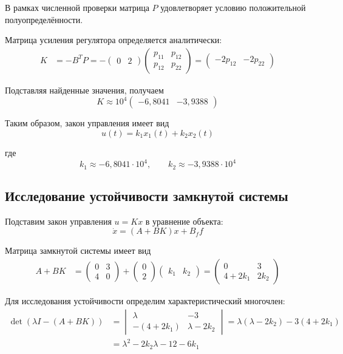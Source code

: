В рамках численной проверки матрица $P$ удовлетворяет
условию положительной полуопределённости.

Матрица усиления регулятора определяется аналитически:
\[
\begin{aligned}
K&=-B^TP=-\begin{pmatrix}0&2\end{pmatrix}
\begin{pmatrix}
p_{11}&p_{12}\\
p_{12}&p_{22}
\end{pmatrix}=\begin{pmatrix}-2p_{12}&-2p_{22}\end{pmatrix}
\end{aligned}
\]

Подставляя найденные значения, получаем
\[
K\approx10^4
\begin{pmatrix}
-6{,}8041&-3{,}9388
\end{pmatrix}
\]

Таким образом, закон управления имеет вид
\[
u(t)=k_1x_1(t)+k_2x_2(t)
\]

где
\[
k_1\approx-6{,}8041\cdot10^4,
\qquad
k_2\approx-3{,}9388\cdot10^4
\]

\subsection{Исследование устойчивости замкнутой системы}

Подставим закон управления $u=Kx$ в уравнение объекта:
\[
\dot{x}=(A+BK)x+B_ff
\]

Матрица замкнутой системы имеет вид
\[
\begin{aligned}
A+BK
&=
\begin{pmatrix}
0&3\\
4&0
\end{pmatrix}
+
\begin{pmatrix}
0\\
2
\end{pmatrix}
\begin{pmatrix}
k_1&k_2
\end{pmatrix}=
\begin{pmatrix}
0&3\\
4+2k_1&2k_2
\end{pmatrix}
\end{aligned}
\]

Для исследования устойчивости определим
характеристический многочлен:
\[
\begin{aligned}
\det(\lambda I-(A+BK))
&=
\begin{vmatrix}
\lambda&-3\\
-(4+2k_1)&\lambda-2k_2
\end{vmatrix}=\lambda(\lambda-2k_2)-3(4+2k_1)\\
&=\lambda^2-2k_2\lambda-12-6k_1
\end{aligned}
\]

